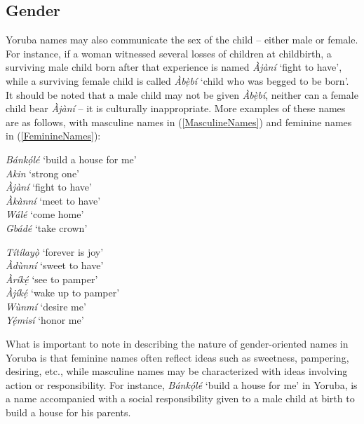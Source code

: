 \documentclass[output=paper,colorlinks,citecolor=brown]{langscibook}
\begin{document}
\subsection{Gender}

Yoruba names may also communicate the sex of the child – either male or female.  For instance, if a woman witnessed several losses of children at childbirth, a surviving male child born after that experience is named \textit{Àjàní} ‘fight to have’, while a surviving female child is called \textit{Àbẹ̀bí} `child who was begged to be born'. It should be noted that a male child may not be given \textit{Àbẹ̀bí}, neither can a female child bear \textit{Àjàní} – it is culturally inappropriate. More examples of these names are as follows, with masculine names in (\ref{MasculineNames}) and feminine names in (\ref{FeminineNames}):

\ea \label{MasculineNames}
\begin{xlist}
\ex	\textit{Bánkọ́lé}	‘build a house for me’\\
\ex	\textit{Akin}		‘strong one’\\
\ex	\textit{Àjàní}		‘fight to have’\\
\ex	\textit{Àkànní}		‘meet to have’ \\
\ex	\textit{Wálé}       	‘come home’\\
\ex	\textit{Gbádé}       	‘take crown’\\
\end{xlist}
\ex \label{FeminineNames}
\begin{xlist}
\ex \textit{Títílayọ̀}		‘forever is joy’\\
\ex	\textit{Àdùnní}		‘sweet to have’\\
\ex	\textit{Àríkẹ́}		‘see to pamper’\\
\ex	\textit{Àjíkẹ́}		‘wake up to pamper’ \\
\ex	\textit{Wùnmí}		‘desire me’\\
\ex	\textit{Yẹ́misí}		‘honor me’ \\
\end{xlist}
\z

What is important to note in describing the nature of gender-oriented names in Yoruba is that feminine names often reflect ideas such as sweetness, pampering, desiring, etc., while masculine names may be characterized with ideas involving action or responsibility. For instance, \textit{Bánkọ́lé} ‘build a house for me’ in Yoruba, is a name accompanied with a social responsibility given to a male child at birth to build a house for his parents.
\end{document}

